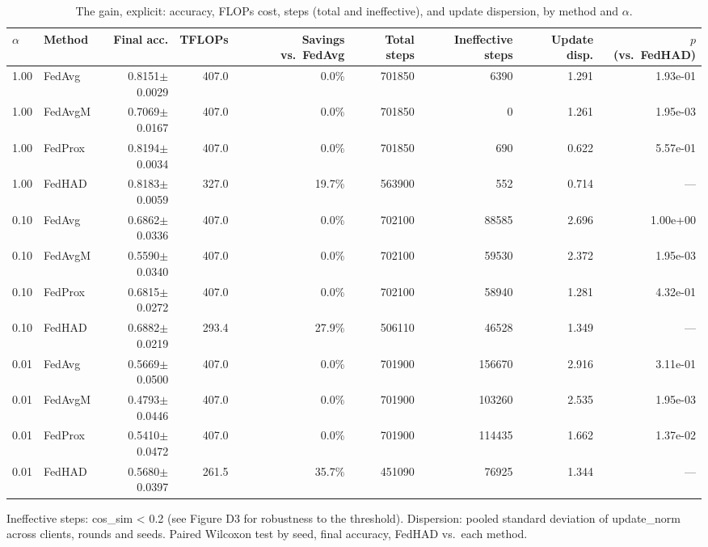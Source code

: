 \begin{table}[t]
\centering
\caption{The gain, explicit: accuracy, FLOPs cost, steps (total and ineffective), and update dispersion, by method and $\alpha$.}
\label{tab:d4-ganho}
\begin{tabular}{llrrrrrrr}
\toprule
$\alpha$ & Method & Final acc. & TFLOPs & Savings vs.\ FedAvg & Total steps & Ineffective steps & Update disp. & $p$ (vs.\ FedHAD) \\
\midrule
1.00 & FedAvg & 0.8151$\pm$0.0029 & 407.0 & 0.0\% & 701850 & 6390 & 1.291 & 1.93e-01 \\
1.00 & FedAvgM & 0.7069$\pm$0.0167 & 407.0 & 0.0\% & 701850 & 0 & 1.261 & 1.95e-03 \\
1.00 & FedProx & 0.8194$\pm$0.0034 & 407.0 & 0.0\% & 701850 & 690 & 0.622 & 5.57e-01 \\
1.00 & FedHAD & 0.8183$\pm$0.0059 & 327.0 & 19.7\% & 563900 & 552 & 0.714 & — \\
0.10 & FedAvg & 0.6862$\pm$0.0336 & 407.0 & 0.0\% & 702100 & 88585 & 2.696 & 1.00e+00 \\
0.10 & FedAvgM & 0.5590$\pm$0.0340 & 407.0 & 0.0\% & 702100 & 59530 & 2.372 & 1.95e-03 \\
0.10 & FedProx & 0.6815$\pm$0.0272 & 407.0 & 0.0\% & 702100 & 58940 & 1.281 & 4.32e-01 \\
0.10 & FedHAD & 0.6882$\pm$0.0219 & 293.4 & 27.9\% & 506110 & 46528 & 1.349 & — \\
0.01 & FedAvg & 0.5669$\pm$0.0500 & 407.0 & 0.0\% & 701900 & 156670 & 2.916 & 3.11e-01 \\
0.01 & FedAvgM & 0.4793$\pm$0.0446 & 407.0 & 0.0\% & 701900 & 103260 & 2.535 & 1.95e-03 \\
0.01 & FedProx & 0.5410$\pm$0.0472 & 407.0 & 0.0\% & 701900 & 114435 & 1.662 & 1.37e-02 \\
0.01 & FedHAD & 0.5680$\pm$0.0397 & 261.5 & 35.7\% & 451090 & 76925 & 1.344 & — \\
\bottomrule
\end{tabular}
\begin{tablenotes}
\footnotesize
\item Ineffective steps: cos\_sim < 0.2 (see Figure D3 for robustness to the threshold). Dispersion: pooled standard deviation of update\_norm across clients, rounds and seeds. Paired Wilcoxon test by seed, final accuracy, FedHAD vs.\ each method.
\end{tablenotes}
\end{table}
